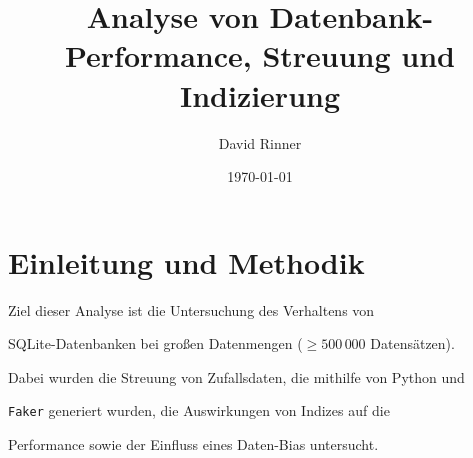 \documentclass{article}
\begin{document}

\title{Analyse von Datenbank-Performance, Streuung und Indizierung}

\author{David Rinner}

\date{\today}

\maketitle



\section{Einleitung und Methodik}

Ziel dieser Analyse ist die Untersuchung des Verhaltens von

SQLite-Datenbanken bei großen Datenmengen
($\geq 500\,000$ Datensätzen).

Dabei wurden die Streuung von Zufallsdaten, die mithilfe von Python und

\texttt{Faker} generiert wurden, die Auswirkungen von Indizes auf die

Performance sowie der Einfluss eines Daten-Bias untersucht.


\end{document}

